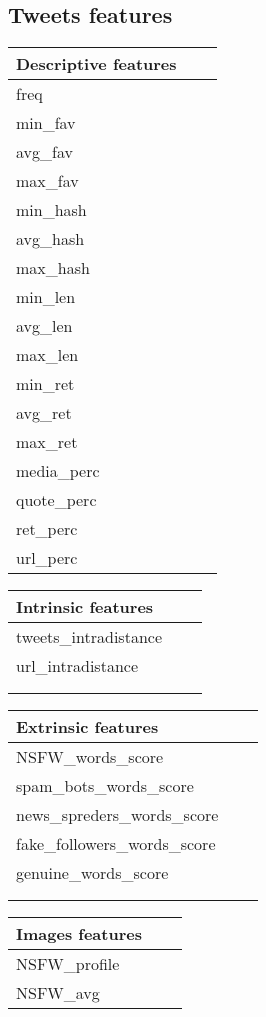 \subsection{Tweets features}
\small
\begin{center}
	\begin{tabular}{lll}
		\textbf{Descriptive features}\\
		\hline\hline
		freq\\
		min\_fav\\
		avg\_fav\\
		max\_fav\\
		min\_hash\\
		avg\_hash\\
		max\_hash\\
		min\_len\\
		avg\_len\\
		max\_len\\
		min\_ret\\
		avg\_ret\\
		max\_ret\\
		media\_perc\\
		quote\_perc\\
		ret\_perc\\
		url\_perc\\\hline
	\end{tabular}
\end{center}
\newpage
\begin{center}
	\begin{tabular}{lll}
		\textbf{Intrinsic features}\\
		\hline\hline
		tweets\_intradistance\\
		url\_intradistance\\\hline\\\\
	\end{tabular}
\end{center}


\begin{center}
	\begin{tabular}{lll}
		\textbf{Extrinsic features}\\
		\hline\hline
		NSFW\_words\_score\\
		spam\_bots\_words\_score\\
		news\_spreders\_words\_score\\
		fake\_followers\_words\_score\\
		genuine\_words\_score\\
		\hline\\\\
	\end{tabular}
\end{center}

\begin{center}
	\begin{tabular}{lll}
		\textbf{Images features}\\
		\hline\hline
		NSFW\_profile\\
		NSFW\_avg\\\hline
	\end{tabular}
\end{center}

\normalsize


